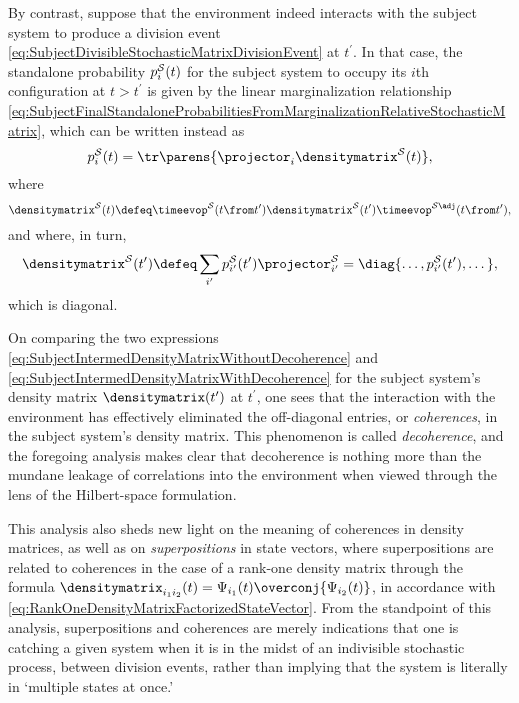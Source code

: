 \documentclass[12pt,english,prl,superscriptaddress,nobibnotes,nofootinbib]{revtex4-2}
\let\originalleft\left
\let\originalright\right
\renewcommand{\left}{\mathopen{}\mathclose\bgroup\originalleft}
\renewcommand{\right}{\aftergroup\egroup\originalright}
\begin{document}
By contrast, suppose that the environment indeed interacts with the
subject system to produce a division event \eqref{eq:SubjectDivisibleStochasticMatrixDivisionEvent}
at $t^{\prime}$. In that case, the standalone probability $p_{i}^{\mathcal{S}}\left(t\right)$
for the subject system to occupy its $i$th configuration at $t>t^{\prime}$
is given by the linear marginalization relationship \eqref{eq:SubjectFinalStandaloneProbabilitiesFromMarginalizationRelativeStochasticMatrix},
which can be written instead as 
\begin{equation}
p_{i}^{\mathcal{S}}\left(t\right)=\tr\parens{\projector_{i}\densitymatrix^{\mathcal{S}}\left(t\right)},\label{eq:SubjectFinalStandaloneProbabilityFromTrace}
\end{equation}
 where 
\begin{equation}
\densitymatrix^{\mathcal{S}}\left(t\right)\defeq\timeevop^{\mathcal{S}}\left(t\from t^{\prime}\right)\densitymatrix^{\mathcal{S}}\left(t^{\prime}\right)\timeevop^{\mathcal{S}\adj}\left(t\from t^{\prime}\right),\label{eq:SubjectFindDensityMatrixFromIntermedWithDecoherence}
\end{equation}
 and where, in turn, 
\begin{equation}
\densitymatrix^{\mathcal{S}}\left(t^{\prime}\right)\defeq\sum_{i^{\prime}}p_{i^{\prime}}^{\mathcal{S}}\left(t^{\prime}\right)\projector_{i^{\prime}}^{\mathcal{S}}=\diag{\dots,p_{i^{\prime}}^{\mathcal{S}}\left(t^{\prime}\right),\dots},\label{eq:SubjectIntermedDensityMatrixWithDecoherence}
\end{equation}
 which is diagonal.

On comparing the two expressions \eqref{eq:SubjectIntermedDensityMatrixWithoutDecoherence}
and \eqref{eq:SubjectIntermedDensityMatrixWithDecoherence} for the
subject system's density matrix $\densitymatrix\left(t^{\prime}\right)$
at $t^{\prime}$, one sees that the interaction with the environment
has effectively eliminated the off-diagonal entries, or \emph{coherences},
in the subject system's density matrix. This phenomenon is called
\emph{decoherence}, and the foregoing analysis makes clear that decoherence
is nothing more than the mundane  leakage of correlations into the
environment when viewed through the lens of the Hilbert-space formulation.

This analysis also sheds new light on the meaning of coherences in
density matrices, as well as on \emph{superpositions} in state vectors,
where superpositions are related to coherences in the case of a rank-one
density matrix through the formula $\densitymatrix_{i_{1}i_{2}}\left(t\right)=\Psi_{i_{1}}\left(t\right)\overconj{\Psi_{i_{2}}\left(t\right)}$,
in accordance with \eqref{eq:RankOneDensityMatrixFactorizedStateVector}.
From the standpoint of this analysis, superpositions and coherences
are merely indications that one is catching a given system when it
is in the midst of an indivisible stochastic process, between division
events, rather than implying that the system is literally in \textquoteleft multiple
states at once.\textquoteright{}
\end{document}
